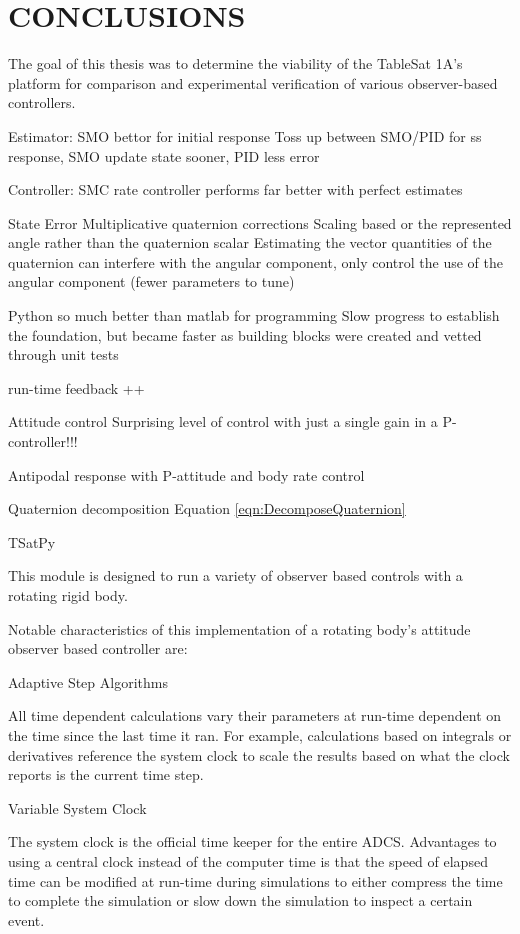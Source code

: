 \chapter{CONCLUSIONS}
\label{chap:Conclusions}

The goal of this thesis was to determine the viability of the TableSat 1A's platform for comparison and experimental verification of various observer-based controllers.


Estimator:
  SMO bettor for initial response
  Toss up between SMO/PID for ss response, SMO update state sooner, PID less error

Controller:
  SMC rate controller performs far better with perfect estimates

State Error
  Multiplicative quaternion corrections
  Scaling based or the represented angle rather than the quaternion scalar
  Estimating the vector quantities of the quaternion can interfere with the angular component, only control the use of the angular component (fewer parameters to tune)

Python so much better than matlab for programming
Slow progress to establish the foundation, but became faster as building blocks were created and vetted through unit tests

run-time feedback ++

Attitude control
  Surprising level of control with just a single gain in a P-controller!!!


Antipodal response with P-attitude and body rate control

Quaternion decomposition Equation \ref{eqn:DecomposeQuaternion}



TSatPy

This module is designed to run a variety of observer based controls with a rotating rigid body.

Notable characteristics of this implementation of a rotating body's attitude observer based controller are:

Adaptive Step Algorithms

All time dependent calculations vary their parameters at run-time dependent on the time since the last time it ran. For example, calculations based on integrals or derivatives reference the system clock to scale the results based on what the clock reports is the current time step.

Variable System Clock

The system clock is the official time keeper for the entire ADCS. Advantages to using a central clock instead of the computer time is that the speed of elapsed time can be modified at run-time during simulations to either compress the time to complete the simulation or slow down the simulation to inspect a certain event.


